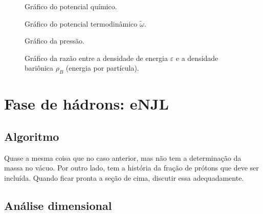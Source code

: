 \begin{figure}
	
	\caption{Gráfico do potencial químico. \protect}
	\label{Fig:chemical_potential_NJL-D_1}
\end{figure}

\begin{figure}
	
	\caption{Gráfico do potencial termodinâmico $\tilde{\omega}$. \protect}
	\label{Fig:thermodynamic_potential_NJL-D_1}
\end{figure}

\begin{figure}
	
	\caption{Gráfico da pressão. \protect}
	\label{Fig:pressure_NJL-D_1}
\end{figure}

\begin{figure}
	
	\caption{Gráfico da razão entre a densidade de energia $\varepsilon$ e a densidade bariônica $\rho_B$ (energia por partícula). \protect}
	\label{Fig:energy_density_per_particle_NJL-D_1}
\end{figure}

\FloatBarrier


\section{Fase de hádrons: eNJL}

\subsection{Algoritmo}

Quase a mesma coisa que no caso anterior, mas não tem a determinação da massa no vácuo. Por outro lado, tem a história da fração de prótons que deve ser incluída. Quando ficar pronta a seção de cima, discutir essa adequadamente.

\subsection{Análise dimensional}

